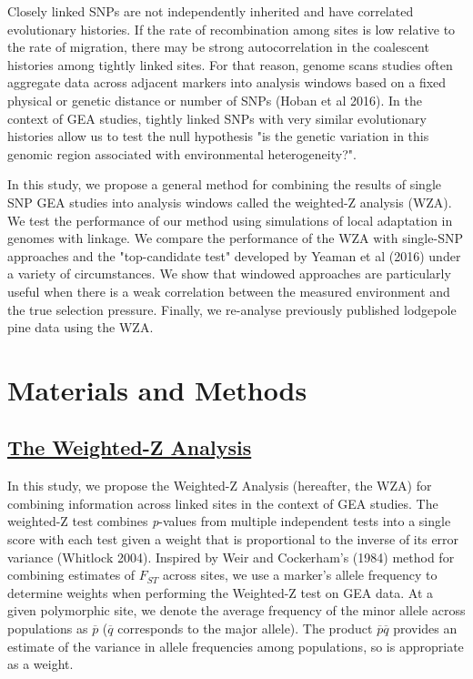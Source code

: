 \documentclass[11pt,twoside,lineno]{GSA_format}
\begin{document}
Closely linked SNPs are not independently inherited and have correlated evolutionary histories. If the rate of recombination among sites is low relative to the rate of migration, there may be strong autocorrelation in the coalescent histories among tightly linked sites. For that reason, genome scans studies often aggregate data across adjacent markers into analysis windows based on a fixed physical or genetic distance or number of SNPs (Hoban et al 2016). In the context of GEA studies, tightly linked SNPs with very similar evolutionary histories allow us to test the null hypothesis "is the genetic variation in this genomic region associated with environmental heterogeneity?". 


In this study, we propose a general method for combining the results of single SNP GEA studies into analysis windows called the weighted-Z analysis (WZA). We test the performance of our method using simulations of local adaptation in genomes with linkage. We compare the performance of the WZA with single-SNP approaches and the "top-candidate test" developed by Yeaman et al (2016) under a variety of circumstances. We show that windowed approaches are particularly useful when there is a weak correlation between the measured environment and the true selection pressure. Finally, we re-analyse previously published lodgepole pine data using the WZA.

\section{Materials and Methods}
\label{sec:materials:methods}

\subsection{\underline{The Weighted-Z Analysis}} 

In this study, we propose the Weighted-Z Analysis (hereafter, the WZA) for combining information across linked sites in the context of GEA studies. The weighted-Z test combines \textit{p}-values from multiple independent tests into a single score with each test given a weight that is proportional to the inverse of its error variance (Whitlock 2004). Inspired by Weir and Cockerham's (1984) method for combining estimates of $F_{ST}$ across sites, we use a marker's allele frequency to determine weights when performing the Weighted-Z test on GEA data. At a given polymorphic site, we denote the average frequency of the minor allele across populations as $\overline{p}$ ($\overline{q}$ corresponds to the major allele). The product $\overline{p}\overline{q}$ provides an estimate of the variance in allele frequencies among populations, so is appropriate as a weight. \\
\end{document}
